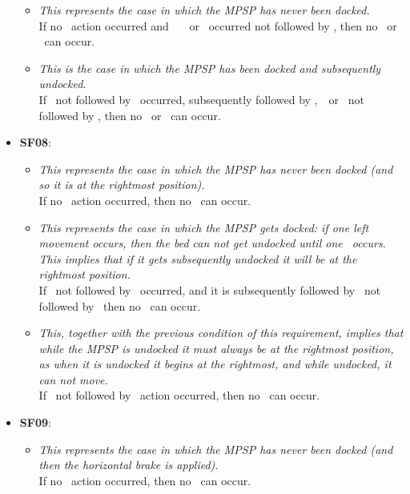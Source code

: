 \begin{itemize}
\begin{itemize}
        \item \textit{This represents the case in which the MPSP has never been docked.}\\
        If no \dock\ action occurred and \tapDown\, \tapUp\, \pressDown\ or \pressUp\ occurred not followed by \dock, then no \motorLeft\ or \motorRight\ can occur.

        \item \textit{This is the case in which the MPSP has been docked and subsequently undocked.}\\
        If \undock\ not followed by \dock\ occurred, subsequently followed by \tapDown,\tapUp\, \pressDown\ or \pressUp\ not followed by \dock, then no \motorLeft\ or \motorRight\ can occur.
\end{itemize}

    \item \textbf{SF08}:
    \begin{itemize}
    \item \textit{This represents the case in which the MPSP has never been docked (and so it is at the rightmost position).}\\
    If no \dock\ action occurred, then no \motorLeft\ can occur.

    \item \textit{This represents the case in which the MPSP gets docked: if one left movement occurs, then the bed can not get undocked until one \rightmostReached\ occurs. This implies that if it gets subsequently undocked it will be at the rightmost position.}\\
    If \dock\ not followed by \undock\ occurred,  and it is subsequently followed by \motorLeft\ not followed by \rightmostReached\ then no \undock\ can occur.

    \item \textit{This, together with the previous condition of this requirement, implies that while the MPSP is undocked it must always be at the rightmost position, as when it is undocked it begins at the rightmost, and while undocked, it can not move.}\\
    If \undock\ not followed by \dock\ action occurred, then no \motorLeft\ can occur.
    \end{itemize}

    \item \textbf{SF09}:
    \begin{itemize}
        \item \textit{This represents the case in which the MPSP has never been docked (and then the horizontal brake is applied).}\\
        If no \dock\ action occurred, then no \releaseHorizontalBrake\ can occur.


\end{itemize}
\end{itemize}
